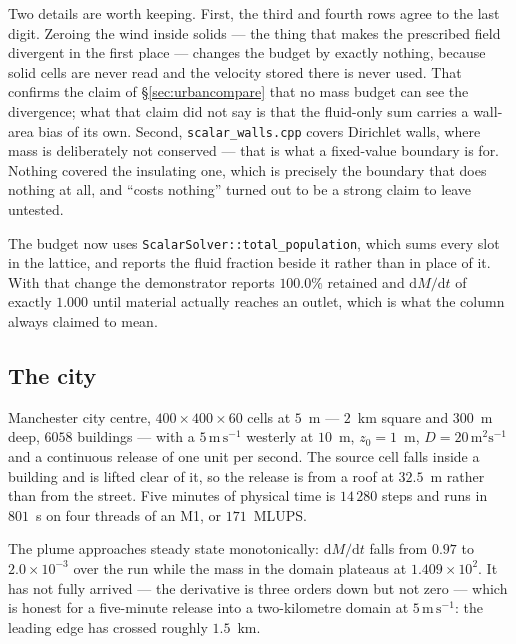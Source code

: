 \documentclass[11pt,a4paper]{article}
\begin{document}
Two details are worth keeping. First, the third and fourth rows agree to the
last digit. Zeroing the wind inside solids --- the thing that makes the
prescribed field divergent in the first place --- changes the budget by exactly
nothing, because solid cells are never read and the velocity stored there is
never used. That confirms the claim of \S\ref{sec:urbancompare} that no mass
budget can see the divergence; what that claim did not say is that the
fluid-only sum carries a wall-area bias of its own. Second,
\texttt{scalar\_walls.cpp} covers Dirichlet walls, where mass is deliberately
not conserved --- that is what a fixed-value boundary is for. Nothing covered
the insulating one, which is precisely the boundary that does nothing at all,
and ``costs nothing'' turned out to be a strong claim to leave untested.

The budget now uses \texttt{ScalarSolver::total\_population}, which sums every
slot in the lattice, and reports the fluid fraction beside it rather than in
place of it. With that change the demonstrator reports $100.0\%$ retained and
$\mathrm{d}M/\mathrm{d}t$ of exactly $1.000$ until material actually reaches an
outlet, which is what the column always claimed to mean.

\subsection{The city}

Manchester city centre, $400\times400\times60$ cells at $5$~m --- $2$~km square
and $300$~m deep, $6058$ buildings --- with a $5\,\mathrm{m\,s^{-1}}$ westerly
at $10$~m, $z_0 = 1$~m, $D = 20\,\mathrm{m^2s^{-1}}$ and a continuous release of
one unit per second. The source cell falls inside a building and is lifted clear
of it, so the release is from a roof at $32.5$~m rather than from the street.
Five minutes of physical time is $14\,280$ steps and runs in $801$~s on four
threads of an M1, or $171$~MLUPS.

The plume approaches steady state monotonically: $\mathrm{d}M/\mathrm{d}t$ falls
from $0.97$ to $2.0\times10^{-3}$ over the run while the mass in the domain
plateaus at $1.409\times10^{2}$. It has not fully arrived --- the derivative is
three orders down but not zero --- which is honest for a five-minute release into
a two-kilometre domain at $5\,\mathrm{m\,s^{-1}}$: the leading edge has crossed
roughly $1.5$~km.
\end{document}
